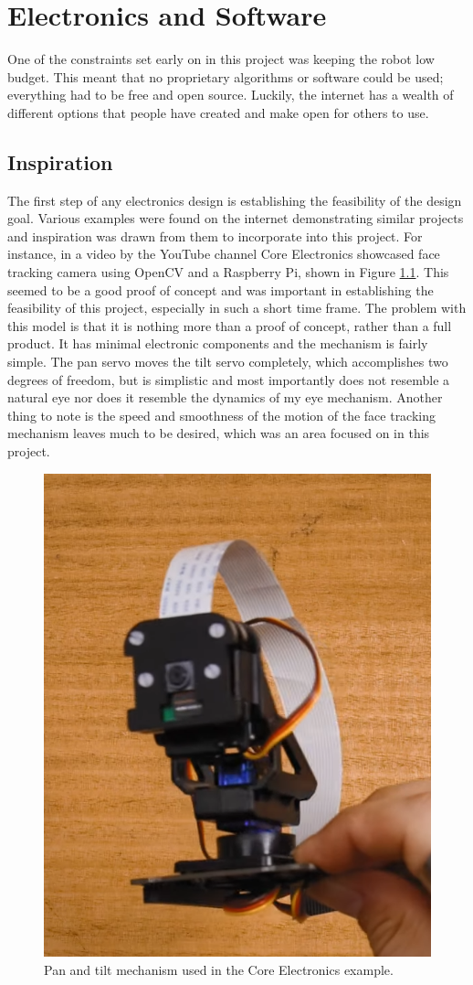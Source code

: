 \chapter{Electronics and Software}
One of the constraints set early on in this project was keeping the robot low budget. This meant that no proprietary algorithms or software could be used; everything had to be free and open source. Luckily, the internet has a wealth of different options that people have created and make open for others to use.
\section{Inspiration}
The first step of any electronics design is establishing the feasibility of the design goal. Various examples were found on the internet demonstrating similar projects and inspiration was drawn from them to incorporate into this project. For instance, in a video by the YouTube channel Core Electronics showcased face tracking camera using OpenCV and a Raspberry Pi, shown in Figure \ref{fig:core-electronics}. This seemed to be a good proof of concept and was important in establishing the feasibility of this project, especially in such a short time frame. The problem with this model is that it is nothing more than a proof of concept, rather than a full product. It has minimal electronic components and the mechanism is fairly simple. The pan servo moves the tilt servo completely, which accomplishes two degrees of freedom, but is simplistic and most importantly does not resemble a natural eye nor does it resemble the dynamics of my eye mechanism. Another thing to note is the speed and smoothness of the motion of the face tracking mechanism leaves much to be desired, which was an area focused on in this project.

\begin{figure}[h]
    \centering
    \includegraphics[width=0.3\linewidth]{Thesis/ch4/core-electronics.png}
    \caption{Pan and tilt mechanism used in the Core Electronics example.}
    \label{fig:core-electronics}
\end{figure}

